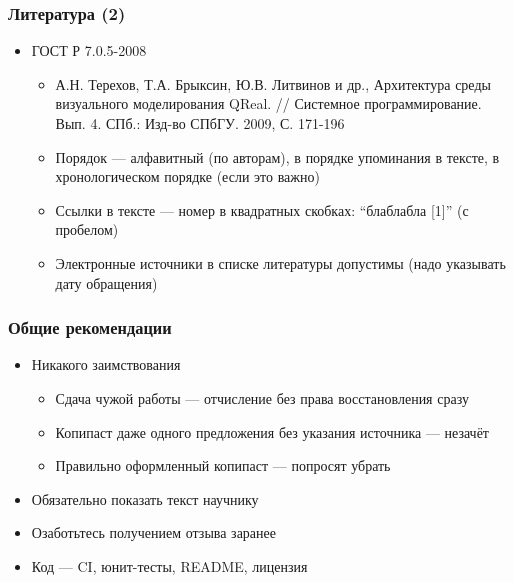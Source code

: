 \documentclass{../../slides-style}
\begin{document}
    \begin{frame}
        \frametitle{Литература (2)}
        \begin{itemize}
            \item ГОСТ Р 7.0.5-2008
            \begin{itemize}
                \item А.Н. Терехов, Т.А. Брыксин, Ю.В. Литвинов и др., Архитектура среды визуального моделирования QReal. // Системное программирование. Вып. 4. СПб.: Изд-во СПбГУ. 2009, С. 171-196
                \item Порядок --- алфавитный (по авторам), в порядке упоминания в тексте, в хронологическом порядке (если это важно)
                \item Ссылки в тексте --- номер в квадратных скобках: ``блаблабла [1]'' (с пробелом)
                \item Электронные источники в списке литературы допустимы (надо указывать дату обращения)
            \end{itemize}
        \end{itemize}
    \end{frame}

    \begin{frame}
        \frametitle{Общие рекомендации}
        \begin{itemize}
            \item Никакого заимствования 
            \begin{itemize}
                \item Сдача чужой работы --- отчисление без права восстановления сразу
                \item Копипаст даже одного предложения без указания источника --- незачёт
                \item Правильно оформленный копипаст --- попросят убрать
            \end{itemize}
            \item Обязательно показать текст научнику
            \item Озаботьтесь получением отзыва заранее
            \item Код --- CI, юнит-тесты, README, лицензия
        \end{itemize}
    \end{frame}
\end{document}
